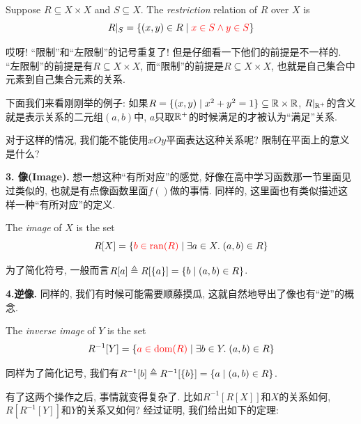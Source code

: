 \begin{definition}[限制 (Restriction)]
  Suppose $R \subseteq X \times X$ and $S \subseteq X$.
  The {\it restriction} relation of $R$  over $X$ is
  \[
    R|_{S} = \{(x, y) \in R \mid \textcolor{red}{x \in S \land y \in S}\}
  \]
\end{definition}

哎呀! ``限制''和``左限制''的记号重复了! 但是仔细看一下他们的前提是不一样的. ``左限制''的前提是有$R \subseteq X \times X$, 而``限制''的前提是$R \subseteq X \times X$, 也就是自己集合中元素到自己集合元素的关系. 

下面我们来看刚刚举的例子: 如果$R = \{(x, y) \mid x^2 + y^2 = 1\} \subseteq \mathbb{R} \times \mathbb{R}$, $R|_{\mathbb{R}^{+}}$的含义就是表示关系的二元组$(a,b)中$, $a$只取$\mathbb{R}^+$的时候满足的才被认为``满足''关系. 

\begin{bonus}
对于这样的情况, 我们能不能使用$xOy$平面表达这种关系呢? 限制在平面上的意义是什么? 
\end{bonus}

\vspace*{1pt}
\textbf{3. 像(Image). } 想一想这种``有所对应''的感觉, 好像在高中学习函数那一节里面见过类似的, 也就是有点像函数里面$f()$做的事情.  同样的, 这里面也有类似描述这样一种``有所对应''的定义. 

\begin{definition}[像 (Image)]
  The {\it image} of $X$  is the set
  \[
    R[X] = \{\textcolor{red}{b \in \text{ran}(R)} \mid \exists a \in X.\; (a, b) \in R\}
  \]
\end{definition}
为了简化符号, 一般而言$R[a] \triangleq R[\{a\}] = \{b \mid (a, b) \in R\}$. 


\textbf{4.逆像. } 同样的, 我们有时候可能需要顺藤摸瓜, 这就自然地导出了像也有``逆''的概念. 

\begin{definition}
  The {\it inverse image} of $Y$  is the set
  \[
    R^{-1}[Y] = \{\textcolor{red}{a \in \text{dom}(R)} \mid \exists b \in Y.\; (a, b) \in R\}
  \]
\end{definition}
同样为了简化记号, 我们有$R^{-1}[b] \triangleq R^{-1}[\{b\}] = \{a \mid (a, b) \in R\}$. 

有了这两个操作之后, 事情就变得复杂了. 比如$R^{-1}[R[X]] $和$ X$的关系如何, $R[R^{-1}[Y]]$和$Y$的关系又如何? 经过证明, 我们给出如下的定理: 
  
